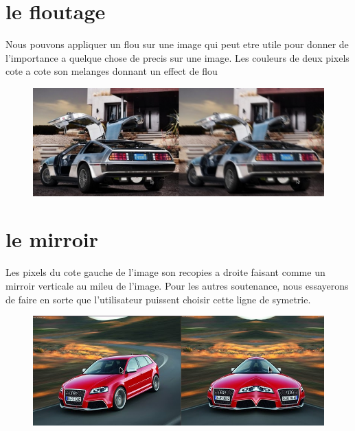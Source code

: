 \documentclass[12pt, a4paper]{report}
\begin{document}
\newpage

\section{le floutage}

Nous pouvons appliquer un flou sur une image qui peut etre utile pour donner de l'importance a quelque chose de precis sur une image.
Les couleurs de deux pixels cote a cote son melanges donnant un effect de flou 

\begin{figure}[!h]
\begin{center} \includegraphics[width=1\textwidth]{images/flou.png} \end{center}
\end{figure}



\section{le mirroir}

Les pixels du cote gauche de l'image son recopies a droite faisant comme un mirroir verticale au mileu de l'image.
Pour les autres soutenance, nous essayerons de faire en sorte que l'utilisateur puissent choisir cette ligne de symetrie.


\begin{figure}[!h]
\begin{center} \includegraphics[width=1\textwidth]{images/mirroir.png} \end{center}
\end{figure}
\end{document}
